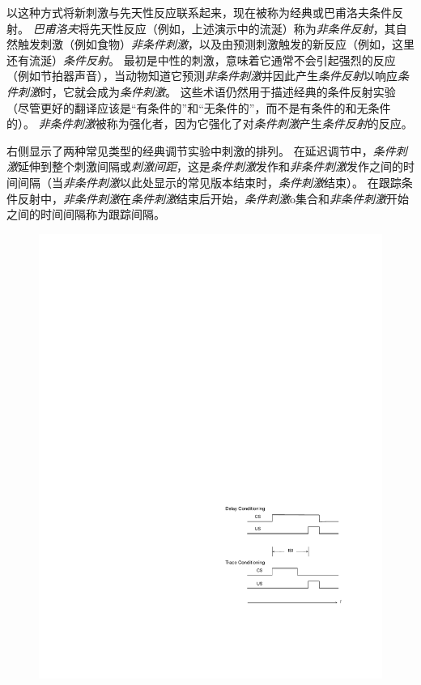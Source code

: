 以这种方式将新刺激与先天性反应联系起来，现在被称为经典或巴甫洛夫条件反射。
\textit{巴甫洛夫}将先天性反应（例如，上述演示中的流涎）称为\textit{非条件反射}，其自然触发刺激（例如食物）\textit{非条件刺激}，以及由预测刺激触发的新反应（例如，这里还有流涎）\textit{条件反射}。
最初是中性的刺激，意味着它通常不会引起强烈的反应（例如节拍器声音），当动物知道它预测\textit{非条件刺激}并因此产生\textit{条件反射}以响应\textit{条件刺激}时，它就会成为\textit{条件刺激}。
这些术语仍然用于描述经典的条件反射实验（尽管更好的翻译应该是“有条件的”和“无条件的”，而不是有条件的和无条件的）。
\textit{非条件刺激}被称为强化者，因为它强化了对\textit{条件刺激}产生\textit{条件反射}的反应。


右侧显示了两种常见类型的经典调节实验中刺激的排列。
在延迟调节中，\textit{条件刺激}延伸到整个刺激间隔或\textit{刺激间距}，这是\textit{条件刺激}发作和\textit{非条件刺激}发作之间的时间间隔（当\textit{非条件刺激}以此处显示的常见版本结束时，\textit{条件刺激}结束）。
在跟踪条件反射中，\textit{非条件刺激}在\textit{条件刺激}结束后开始，\textit{条件刺激}o集合和\textit{非条件刺激}开始之间的时间间隔称为跟踪间隔。


\begin{figure}[!htb]
	\centering
	\includegraphics[width=0.5\linewidth]{chap11/fig_11_0}
	\caption{  \label{fig:11_0}}
\end{figure}


